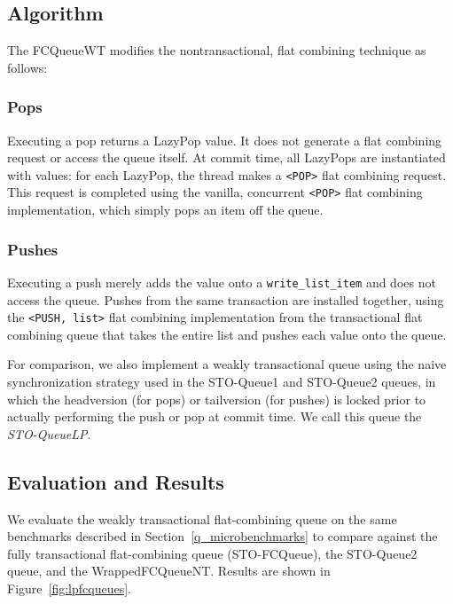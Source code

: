 \subsection{Algorithm}

The FCQueueWT modifies the nontransactional, flat combining technique as follows:
   \subsubsection{Pops}
    Executing a pop returns a LazyPop value. It does not generate a flat combining request or access the queue itself. At commit time, all LazyPops are instantiated with values: for each LazyPop, the thread makes a \texttt{<POP>} flat combining request. This request is completed using the vanilla, concurrent \texttt{<POP>} flat combining implementation, which simply pops an item off the queue.

    \subsubsection{Pushes}
    Executing a push merely adds the value onto a \texttt{write\_list\_item} and does not access the queue. Pushes from the same transaction are installed together, using the \texttt{<PUSH, list>} flat combining implementation from the transactional flat combining queue that takes the entire list and pushes each value onto the queue.

For comparison, we also implement a weakly transactional queue using the naive synchronization strategy used in the STO-Queue1 and STO-Queue2 queues, in which the headversion (for pops) or tailversion (for pushes) is locked prior to actually performing the push or pop at commit time. We call this queue the \emph{STO-QueueLP}.


\subsection{Evaluation and Results}

We evaluate the weakly transactional flat-combining queue on the same benchmarks described in Section~\ref{q_microbenchmarks} to compare against the fully transactional flat-combining queue (STO-FCQueue), the STO-Queue2 queue, and the WrappedFCQueueNT. Results are shown in Figure~\ref{fig:lpfcqueues}.

